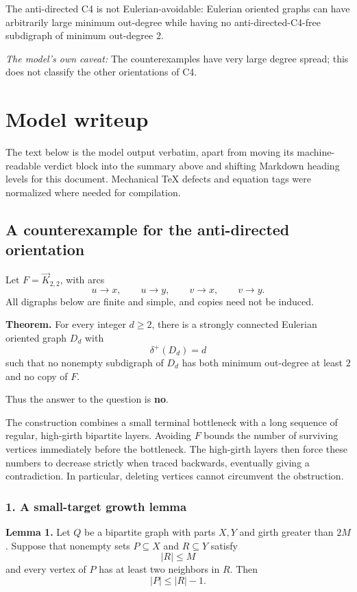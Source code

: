 \documentclass[
  11pt,
  a4paper,
]{article}
\newcounter{none} %
\begin{document}
The anti-directed C4 is not Eulerian-avoidable: Eulerian oriented graphs
can have arbitrarily large minimum out-degree while having no
anti-directed-C4-free subdigraph of minimum out-degree 2.

\emph{The model's own caveat:} The counterexamples have very large
degree spread; this does not classify the other orientations of C4.

\section{Model writeup}\label{model-writeup}

The text below is the model output verbatim, apart from moving its
machine-readable verdict block into the summary above and shifting
Markdown heading levels for this document. Mechanical TeX defects and
equation tags were normalized where needed for compilation.

\subsection{A counterexample for the anti-directed
orientation}\label{a-counterexample-for-the-anti-directed-orientation}

Let \(F=\vec K_{2,2}\), with arcs \[
u\to x,\qquad u\to y,\qquad v\to x,\qquad v\to y.
\] All digraphs below are finite and simple, and copies need not be
induced.

\textbf{Theorem.} For every integer \(d\ge 2\), there is a strongly
connected Eulerian oriented graph \(D_d\) with \[
\delta^+(D_d)=d
\] such that no nonempty subdigraph of \(D_d\) has both minimum
out-degree at least \(2\) and no copy of \(F\).

Thus the answer to the question is \textbf{no}.

The construction combines a small terminal bottleneck with a long
sequence of regular, high-girth bipartite layers. Avoiding \(F\) bounds
the number of surviving vertices immediately before the bottleneck. The
high-girth layers then force these numbers to decrease strictly when
traced backwards, eventually giving a contradiction. In particular,
deleting vertices cannot circumvent the obstruction.

\subsubsection{1. A small-target growth
lemma}\label{a-small-target-growth-lemma}

\textbf{Lemma 1.} Let \(Q\) be a bipartite graph with parts \(X,Y\) and
girth greater than \(2M\). Suppose that nonempty sets \(P\subseteq X\)
and \(R\subseteq Y\) satisfy \[
|R|\le M
\] and every vertex of \(P\) has at least two neighbors in \(R\). Then
\[
|P|\le |R|-1.
\]
\end{document}
